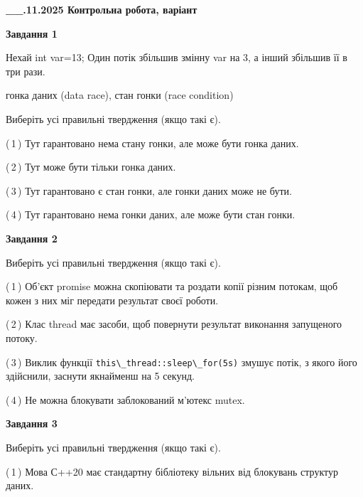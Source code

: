 \documentclass[12pt, ukrainian]{article}
\def\code#1{\Verb!#1!}
\begin{document}
\begin {large}

\textbf{\_\_.11.2025 Контрольна робота, варіант  }\par


{

\begin{center}
\textbf{Завдання 1}
\end{center}
Нехай int var=13; Один потік збільшив змінну var на 3, а інший збільшив її в три рази.

гонка даних (data race), стан гонки (race condition)

Виберіть усі правильні твердження (якщо такі є).\par
\vspace{2mm}
(\,1\,) Тут гарантовано нема стану гонки, але може бути гонка даних.%

(\,2\,) Тут може бути тільки гонка даних.%

(\,3\,) Тут гарантовано є стан гонки, але гонки даних може не бути.%

(\,4\,) Тут гарантовано нема гонки даних, але може бути стан гонки.%



\begin{center}
\textbf{Завдання 2}
\end{center}
Виберіть усі правильні твердження (якщо такі є).\par
\vspace{2mm}

(\,1\,) Об’єкт promise можна скопіювати та роздати копії різним потокам, щоб кожен з них міг передати результат своєї роботи.%

(\,2\,) Клас thread має засоби, щоб повернути результат виконання запущеного потоку.%

(\,3\,) Виклик функції \code{this\_thread::sleep\_for(5s)} змушує потік, з якого його здійснили, заснути якнайменш на 5 секунд.%

(\,4\,) Не можна блокувати заблокований м’ютекс mutex.%



\begin{center}
\textbf{Завдання 3}
\end{center}
Виберіть усі правильні твердження (якщо такі є).\par
\vspace{2mm}

(\,1\,) Мова С++20 має стандартну бібліотеку вільних від блокувань структур даних.%

}
\end{large}
\end{document}
